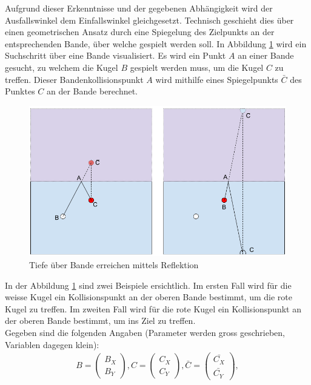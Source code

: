 Aufgrund dieser Erkenntnisse und der gegebenen Abhängigkeit wird der Ausfallswinkel dem Einfallswinkel gleichgesetzt.
Technisch geschieht dies über einen geometrischen Ansatz durch eine Spiegelung\cite{math.stackexchange:1}
des Zielpunkts an der entsprechenden Bande, über welche gespielt werden soll. In Abbildung \ref{fig:Tiefe über Bande erreichen mittels Reflektion}
wird ein Suchschritt über eine Bande visualisiert. Es wird ein Punkt $A$ an einer Bande gesucht, zu welchem die Kugel $B$
gespielt werden muss, um die Kugel $C$ zu treffen. Dieser Bandenkollisionspunkt $A$ wird mithilfe eines Spiegelpunkts $\bar{C}$
des Punktes $C$ an der Bande berechnet.
\begin{figure}[h!]
    \begin{center}
        \includegraphics[width=0.5\linewidth]{../common/03_billiard_ai/resources/47_rail_reflection_1.png}
    \end{center}
    \caption{Tiefe über Bande erreichen mittels Reflektion}
    \label{fig:Tiefe über Bande erreichen mittels Reflektion}
\end{figure}
In der Abbildung \ref{fig:Tiefe über Bande erreichen mittels Reflektion} sind zwei Beispiele ersichtlich.
Im ersten Fall wird für die weisse Kugel ein Kollisionspunkt an der oberen Bande bestimmt, um die rote Kugel zu treffen.
Im zweiten Fall wird für die rote Kugel ein Kollisionspunkt an der oberen Bande bestimmt, um ins Ziel zu treffen.\\
Gegeben sind die folgenden Angaben (Parameter werden gross geschrieben, Variablen dagegen klein):
\begin{align}
    B = \begin{pmatrix}B_X\\B_Y\end{pmatrix},
    C = \begin{pmatrix}C_X\\C_Y\end{pmatrix},
    \bar{C} = \begin{pmatrix}\bar{C_X}\\\bar{C_Y}\end{pmatrix},
\end{align}
